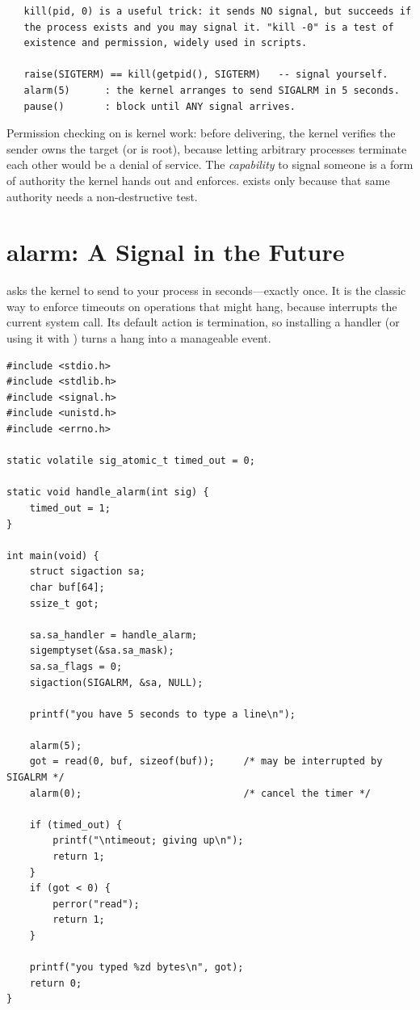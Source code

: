\begin{verbatim}
   kill(pid, 0) is a useful trick: it sends NO signal, but succeeds if
   the process exists and you may signal it. "kill -0" is a test of
   existence and permission, widely used in scripts.

   raise(SIGTERM) == kill(getpid(), SIGTERM)   -- signal yourself.
   alarm(5)      : the kernel arranges to send SIGALRM in 5 seconds.
   pause()       : block until ANY signal arrives.
\end{verbatim}

\begin{osconcept}
Permission checking on  is kernel work: before delivering,
the kernel verifies the sender owns the target (or is root), because
letting arbitrary processes terminate each other would be a denial of
service. The \emph{capability} to signal someone is a form of
authority the kernel hands out and enforces. 
exists only because that same authority needs a non-destructive test.
\end{osconcept}

\section{alarm: A Signal in the Future}

 asks the kernel to send  to your process
in  seconds---exactly once. It is the classic way to enforce
timeouts on operations that might hang, because 
interrupts the current system call. Its default action is termination,
so installing a handler (or using it with ) turns a
hang into a manageable event.

\begin{lstlisting}[caption={A timeout guard around an I/O read.}]
#include <stdio.h>
#include <stdlib.h>
#include <signal.h>
#include <unistd.h>
#include <errno.h>

static volatile sig_atomic_t timed_out = 0;

static void handle_alarm(int sig) {
    timed_out = 1;
}

int main(void) {
    struct sigaction sa;
    char buf[64];
    ssize_t got;

    sa.sa_handler = handle_alarm;
    sigemptyset(&sa.sa_mask);
    sa.sa_flags = 0;
    sigaction(SIGALRM, &sa, NULL);

    printf("you have 5 seconds to type a line\n");

    alarm(5);
    got = read(0, buf, sizeof(buf));     /* may be interrupted by SIGALRM */
    alarm(0);                            /* cancel the timer */

    if (timed_out) {
        printf("\ntimeout; giving up\n");
        return 1;
    }
    if (got < 0) {
        perror("read");
        return 1;
    }

    printf("you typed %zd bytes\n", got);
    return 0;
}
\end{lstlisting}

